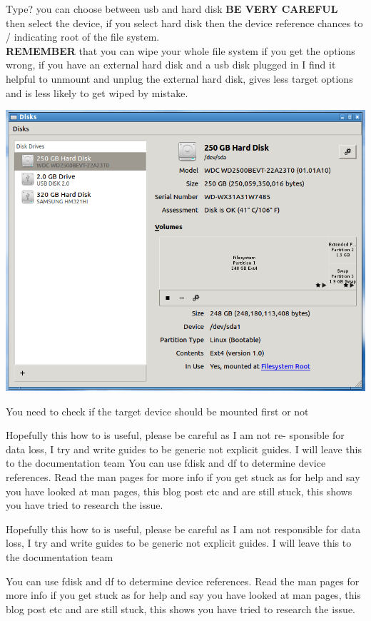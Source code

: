 \documentclass[12pt,a4paper]{book}
\begin{document}
Type? you can choose between usb and hard disk \textbf{BE VERY CAREFUL} \\

then select the device, if you select hard disk then the device reference chances to / indicating root of the file system. \\

\textbf{REMEMBER} that you can wipe your whole file system if you get the options wrong,  if you have an external hard disk and a usb disk plugged in I find it helpful to unmount and unplug the external hard disk,  gives less target options and is less likely to get wiped by mistake. \\

 
\begin{center}
\includegraphics[width=0.7\linewidth]{screen-shots/unetbootin4}
\end{center}
You need to check if the target device should be mounted first or not

Hopefully this how to is useful, please be careful as I am not re-
sponsible for data loss, I try and write guides to be generic not
explicit guides. I will leave this to the documentation team
You can use fdisk and df to determine device references. Read the
man pages for more info if you get stuck as for help and say you
have looked at man pages, this blog post etc and are still stuck,
this shows you have tried to research the issue.

Hopefully this how to is useful,  please be careful as I am not responsible for data loss,  I try and write guides to be generic not explicit guides.  I will leave this to the documentation team

You can use fdisk and df to determine device references. Read the man pages for more info if you get stuck as for help and say you have looked at man pages,  this blog post etc and are still stuck,  this shows you have tried to research the issue.
\end{document}
